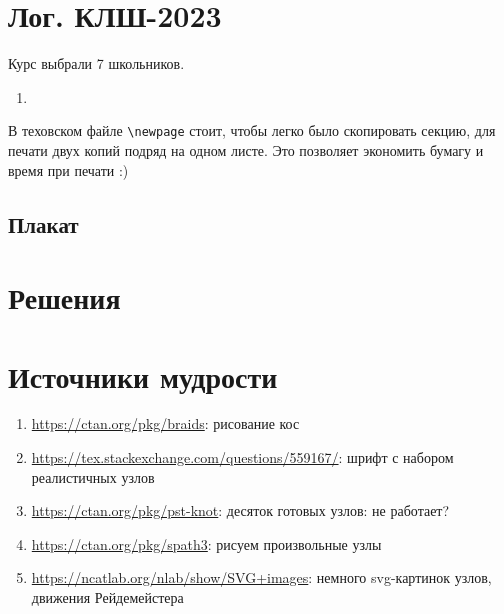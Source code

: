 \documentclass[12pt]{article}
\newcounter{problem}[section]
\theoremstyle{definition}
\begin{document}
\section{Лог. КЛШ-2023}

Курс выбрали 7 школьников.

\begin{enumerate}
  \item 
\end{enumerate}

В теховском файле \verb|\newpage| стоит, чтобы легко было скопировать секцию, для печати двух копий подряд на одном листе.
Это позволяет экономить бумагу и время при печати :)

\subsection{Плакат}






\renewenvironment{solution}[1]{%
         \vskip .5cm plus 2cm minus 0.1cm%
         {\bfseries \hyperlink{problem:#1}{#1.}}%
}%
{%
}%



\section{Решения}



\section{Источники мудрости}


\begin{enumerate}
\item \url{https://ctan.org/pkg/braids}: рисование кос
\item \url{https://tex.stackexchange.com/questions/559167/}: шрифт с набором реалистичных узлов
\item \url{https://ctan.org/pkg/pst-knot}: десяток готовых узлов: не работает?
\item \url{https://ctan.org/pkg/spath3}: рисуем произвольные узлы
\item \url{https://ncatlab.org/nlab/show/SVG+images}: немного svg-картинок узлов, движения Рейдемейстера
\end{enumerate}

\printbibliography[heading=none]
\end{document}
